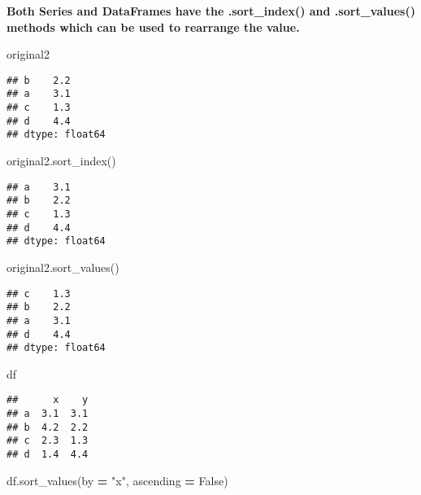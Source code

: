 \documentclass[
]{book}
\newenvironment{Shaded}{\begin{snugshade}}{\end{snugshade}}
\newcommand{\NormalTok}[1]{#1}
\newcommand{\OperatorTok}[1]{\textcolor[rgb]{0.81,0.36,0.00}{\textbf{#1}}}
\newcommand{\StringTok}[1]{\textcolor[rgb]{0.31,0.60,0.02}{#1}}
\newcommand{\VariableTok}[1]{\textcolor[rgb]{0.00,0.00,0.00}{#1}}
\begin{document}
{\textbf{Both Series and DataFrames have the .sort\_index() and .sort\_values() methods which can be used to rearrange the value.}}

\begin{Shaded}
\begin{Highlighting}[]
\NormalTok{original2}
\end{Highlighting}
\end{Shaded}

\begin{verbatim}
## b    2.2
## a    3.1
## c    1.3
## d    4.4
## dtype: float64
\end{verbatim}

\begin{Shaded}
\begin{Highlighting}[]
\NormalTok{original2.sort\_index()}
\end{Highlighting}
\end{Shaded}

\begin{verbatim}
## a    3.1
## b    2.2
## c    1.3
## d    4.4
## dtype: float64
\end{verbatim}

\begin{Shaded}
\begin{Highlighting}[]
\NormalTok{original2.sort\_values()}
\end{Highlighting}
\end{Shaded}

\begin{verbatim}
## c    1.3
## b    2.2
## a    3.1
## d    4.4
## dtype: float64
\end{verbatim}

\begin{Shaded}
\begin{Highlighting}[]
\NormalTok{df}
\end{Highlighting}
\end{Shaded}

\begin{verbatim}
##      x    y
## a  3.1  3.1
## b  4.2  2.2
## c  2.3  1.3
## d  1.4  4.4
\end{verbatim}

\begin{Shaded}
\begin{Highlighting}[]
\NormalTok{df.sort\_values(by }\OperatorTok{=} \StringTok{"x"}\NormalTok{, ascending }\OperatorTok{=} \VariableTok{False}\NormalTok{)}
\end{Highlighting}
\end{Shaded}
\end{document}
